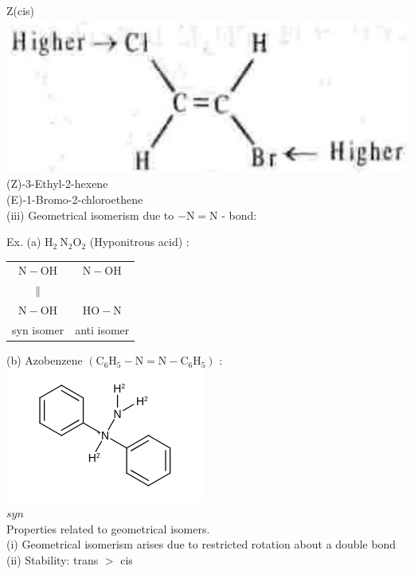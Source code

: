 \documentclass[10pt]{article}
\begin{document}
Z(cis)\\
\includegraphics[max width=\textwidth, center]{2025_01_28_8470952b98110cec3aabg-046}\\
(Z)-3-Ethyl-2-hexene\\
(E)-1-Bromo-2-chloroethene\\
(iii) Geometrical isomerism due to $-\mathrm{N}=\mathrm{N}$ - bond:

Ex. (a) $\mathrm{H}_{2} \mathrm{~N}_{2} \mathrm{O}_{2}$ (Hyponitrous acid) :

\begin{center}
\begin{tabular}{cc}
$\mathrm{N}-\mathrm{OH}$ & $\mathrm{N}-\mathrm{OH}$ \\
$\|$ &  \\
$\mathrm{N}-\mathrm{OH}$ & $\mathrm{HO}-\mathrm{N}$ \\
syn isomer & anti isomer \\
\end{tabular}
\end{center}

(b) Azobenzene $\left(\mathrm{C}_{6} \mathrm{H}_{5}-\mathrm{N}=\mathrm{N}-\mathrm{C}_{6} \mathrm{H}_{5}\right)$ :\\
\includegraphics{smile-ee69a1cf62a250c165a91f3fa9d979219f01e2c8}\\
$s y n$\\
Properties related to geometrical isomers.\\
(i) Geometrical isomerism arises due to restricted rotation about a double bond\\
(ii) Stability: trans $>$ cis
\end{document}
